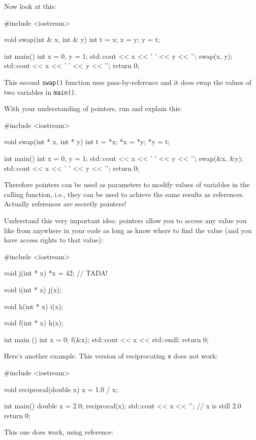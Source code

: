 Now look at this:

\begin{consolethree}[escapeinside=||]
#include <iostream>

void swap(int & x, int & y)
{    
     int t = x;
     x = y;
     y = t;
}

int main()
{   
    int x = 0, y = 1;
    std::cout << x << ' ' << y << '\n';
    swap(x, y);
    std::cout << x << ' ' << y << '\n';
    return 0;
}
\end{consolethree}
This second \texttt{swap()} function uses pass-by-reference and it does swap the values of two variables in \texttt{main()}.

With your understanding of pointers, run and explain this:

\begin{consolethree}[escapeinside=||]
#include <iostream>

void swap(int * x, int * y)
{    
     int t = *x;
     *x = *y;
     *y = t;
}

int main()
{   
    int x = 0, y = 1;
    std::cout << x << ' ' << y << '\n';
    swap(&x, &y);
    std::cout << x << ' ' << y << '\n';
    return 0;
}
\end{consolethree}
Therefore pointers can be used as parameters to modify values of variables in the calling function, i.e., they can be used to achieve the same results as references. Actually references are secretly pointers!

Understand this very important idea: pointers allow you to access any value you like from anywhere in your code as long as know where to find the value (and you have access rights to that value):

\begin{consolethree}[escapeinside=||]

#include <iostream>

void j(int * x)
{    
     *x = 42; // TADA!
}

void i(int * x)
{
    j(x);
}

void h(int * x)
{
    i(x);
}

void f(int * x)
{
    h(x);
}

int main ()
{
    int x = 0;
    f(&x);
    std::cout << x << std::endl;
    return 0;
}
\end{consolethree}
Here's another example. This version of reciprocating \texttt{x} does not
work:

\begin{consolethree}[escapeinside=||]
#include <iostream>

void reciprocal(double x)
{
    x = 1.0 / x;
}

int main()
{
    double x = 2.0;
    reciprocal(x);
    std::cout << x << '\n';     // x is still 2.0
    return 0;
}
\end{consolethree}
This one does work, using reference:


